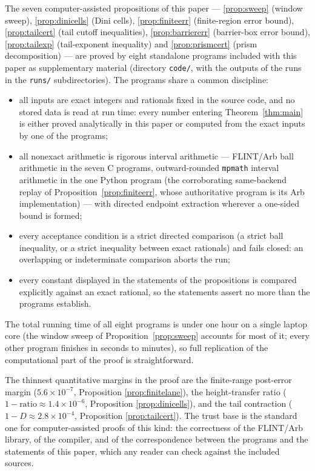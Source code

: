 \documentclass[11pt]{article}
\theoremstyle{definition}
\begin{document}
The seven computer-assisted propositions of this paper ---
\ref{prop:sweep} (window sweep), \ref{prop:dinicells} (Dini
cells), \ref{prop:finiteerr} (finite-region error bound),
\ref{prop:tailcert} (tail cutoff inequalities),
\ref{prop:barriererr} (barrier-box error bound),
\ref{prop:tailexp} (tail-exponent inequality) and
\ref{prop:prismcert} (prism decomposition) --- are proved by eight
standalone programs included with this paper as supplementary
material (directory \texttt{code/}, with the outputs of the runs
in the \texttt{runs/} subdirectories). The programs share a common
discipline:
\begin{itemize}
\item all inputs are exact integers and rationals fixed in the
source code, and no stored data is read at run time: every number
entering Theorem~\ref{thm:main} is either proved analytically in
this paper or computed from the exact inputs by one of the
programs;
\item all nonexact arithmetic is rigorous interval arithmetic ---
FLINT/Arb ball arithmetic in the seven C programs, outward-rounded
\texttt{mpmath} interval arithmetic in the one Python program (the
corroborating same-backend replay of
Proposition~\ref{prop:finiteerr}, whose authoritative program is
its Arb implementation) ---
with directed endpoint extraction wherever a one-sided bound is
formed;
\item every acceptance condition is a strict directed comparison
(a strict ball inequality, or a strict inequality between exact
rationals) and fails closed: an overlapping or indeterminate
comparison aborts the run;
\item every constant displayed in the statements of the
propositions is compared explicitly against an exact rational, so
the statements assert no more than the programs establish.
\end{itemize}
The total running time of all eight programs is under one hour on
a single laptop core (the window sweep of
Proposition~\ref{prop:sweep} accounts for most of it; every other
program finishes in seconds to minutes), so full replication of
the computational part of the proof is straightforward.

The thinnest quantitative margins in the proof are the
finite-range post-error margin ($5.6\times10^{-7}$, Proposition
\ref{prop:finitelane}), the height-transfer ratio
($1-\text{ratio}\approx1.4\times10^{-6}$, Proposition
\ref{prop:dinicells}), and the tail contraction
($1-D\approx2.8\times10^{-4}$, Proposition \ref{prop:tailcert}).
The trust base is the standard one for computer-assisted proofs of
this kind: the correctness of the FLINT/Arb library, of the
compiler, and of the correspondence between the programs and the
statements of this paper, which any reader can check against the
included sources.
\end{document}
